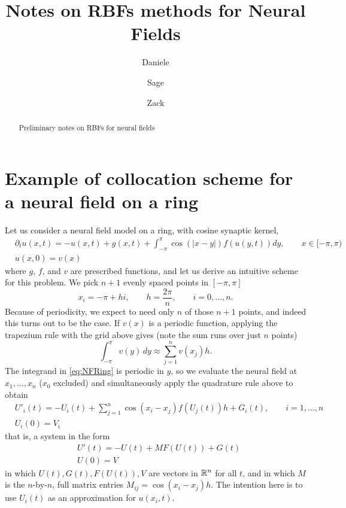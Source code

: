 \documentclass[a4paper]{siamart190516}
\title{Notes on RBFs methods for Neural Fields}
\author{%
  Daniele 
  \and
  Sage 
  \and 
  Zack 
}
\begin{document}
\maketitle

\begin{abstract}
  Preliminary notes on RBFs for neural fields
\end{abstract}
  
\section{Example of collocation scheme for a neural field on a ring} 
Let us consider a neural field model on a ring, with cosine synaptic kernel, 
\begin{equation}\label{eq:NFRing}
  \begin{aligned}
 & \partial_t u(x,t) =  -u(x,t) + g(x,t)+ \int_{-\pi}^{\pi} \cos(|x-y|) f(u(y,t)) dy,
   \qquad x \in [-\pi,\pi) \\
 & u(x,0) = v(x) 
  \end{aligned}
\end{equation}
where $g$, $f$, and $v$ are prescribed functions, and let us derive an intuitive scheme
for this problem. We pick $n+1$ evenly spaced points in $[-\pi,\pi]$
\begin{equation}\label{eq:nodesRing}
  x_i = -\pi + h i, \qquad h = \frac{2\pi}{n}, \qquad i = 0, \ldots, n.
\end{equation}
Because of periodicity, we expect to need only $n$ of those $n+1$ points, and indeed
this turns out to be the case. If $v(x)$ is a periodic function, applying the
trapezium rule with the grid above gives (note the sum runs over just $n$ points)
\[
  \int_{-\pi}^{\pi} v(y)\,d y \approx \sum_{j=1}^{n} v(x_j) h.
\]
The integrand in \cref{eq:NFRing} is periodic in $y$, so we evaluate the neural
field at $x_1, \ldots, x_n$ ($x_0$ excluded) and simultaneously apply the quadrature rule
above to obtain
\[
  \begin{aligned}
  & U'_i(t) = -U_i(t) + \sum_{j=1}^{n} \cos(x_i - x_j) f(U_j(t)) h + G_i(t), \qquad i = 1,\ldots,n  \\
  & U_i(0) = V_i
  \end{aligned}
\]
that is, a system in the form 
\begin{equation}
  \begin{aligned}
   &  U'(t) = - U(t) + M F(U(t)) +  G(t)\\ 
   &  U(0) = V
  \end{aligned}
\end{equation}  
in which $U(t), G(t), F(U(t)), V$ are vectors in $\mathbb{R}^n$ for all $t$, and in which
$M$ is the $n$-by-$n$, full matrix entries $M_{ij} = \cos(x_i - x_j)h$. The intention
here is to use $U_i(t)$ as an approximation for $u(x_i,t)$.
\end{document}
